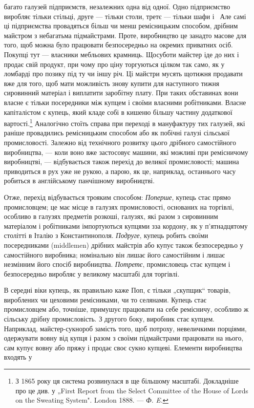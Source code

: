 \parcont{}  %
багато галузей підприємств, незалежних одна від одної. Одно
підприємство виробляє тільки стільці, друге — тільки столи,
третє — тільки шафи і~ Але самі ці підприємства провадяться
більш чи менш ремісницьким способом, дрібним майстром з небагатьма
підмайстрами. Проте, виробництво це занадто масове для
того, щоб можна було працювати безпосередньо на окремих
приватних осіб. Покупці тут — власники мебльових крамниць.
Щосуботи майстер іде до них і продає свій продукт, при чому
про ціну торгуються цілком так само, як у ломбарді про позику
під ту чи іншу річ. Ці майстри мусять щотижня продавати вже
для того, щоб мати можливість знову купити для наступного
тижня сировинний матеріал і виплатити заробітну плату. При
таких обставинах вони власне є тільки посередники між купцем
і своїми власними робітниками. Власне капіталістом є купець,
який кладе собі в кишеню більшу частину додаткової вартості.\footnote{
З 1865 року ця система розвинулася в ще більшому масштабі. Докладніше
про це див. у „First Report from the Select Committee of the House of Lords on
the Sweating System". London 1888. — \emph{Ф. E.}
}
Аналогічно стоїть справа при переході в мануфактуру тих галузей,
які раніше провадились ремісницьким способом або як
побічні галузі сільської промисловості. Залежно від технічного
розвитку цього дрібного самостійного виробництва, — коли воно
вже застосовує машини, які можливі при ремісничому виробництві,
— відбувається також перехід до великої промисловості;
машина приводиться в рух уже не рукою, а парою, як це, наприклад,
останнього часу робиться в англійському панчішному
виробництві.

Отже, перехід відбувається трояким способом: \emph{Поперше},
купець стає прямо промисловцем; це має місце в галузях промисловості,
основаних на торгівлі, особливо в галузях предметів
розкоші, галузях, які разом з сировинним матеріалом і робітниками
імпортуються купцями зза кордону, як у п’ятнадцятому
столітті в Італію з Константинополя. \emph{Подруге}, купець робить
своїми посередниками (middlemen) дрібних майстрів або купує
також безпосередньо у самостійного виробника; номінально
він лишає його самостійним і лишає незмінним його спосіб виробництва.
\emph{Потретє}, промисловець стає купцем і безпосередньо
виробляє у великому масштабі для торгівлі.

В середні віки купець, як правильно каже Поп, є тільки
„скупщик“ товарів, вироблених чи цеховими ремісниками, чи то
селянами. Купець стає промисловцем або, точніше, примушує
працювати на себе ремісничу, особливо ж сільську дрібну промисловість.
З другого боку, виробник стає купцем. Наприклад,
майстер-сукнороб замість того, щоб потроху, невеличкими
порціями, одержувати вовну від купця і разом з своїми підмайстрами
працювати на нього, сам купує вовну або пряжу і
продає своє сукно купцеві. Елементи виробництва входять у
\parbreak{}  %

